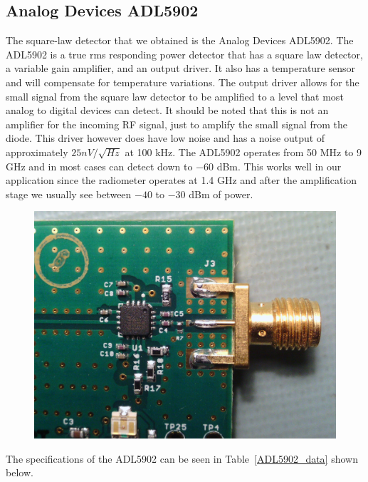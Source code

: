 \subsection{Analog Devices ADL5902}

The square-law detector that we obtained is the Analog Devices ADL5902.  The ADL5902 is a true rms responding power detector that has a square law detector, a variable gain amplifier, and an output driver. It also has a temperature sensor and will compensate for temperature variations.  The output driver allows for the small signal from the square law detector to be amplified to a level that most analog to digital devices can detect.  It should be noted that this is not an amplifier for the incoming RF signal, just to amplify the small signal from the diode.  This driver however does have low noise and has a noise output of approximately $25nV/ \sqrt{Hz}$ at 100 kHz.  The ADL5902 operates from 50 MHz to 9 GHz and in most cases can detect down to $-60$ dBm.  This works well in our application since the radiometer operates at 1.4 GHz and after the amplification stage we usually see between $-40$ to $-30$ dBm of power.  

{\begin{figure}[h!tb] \centering
\includegraphics[width=\textwidth]{Images/adl5902.jpg}
\label{ADL5902}
\end{figure}
}

The specifications of the ADL5902 can be seen in Table~\ref{ADL5902_data} shown below.

